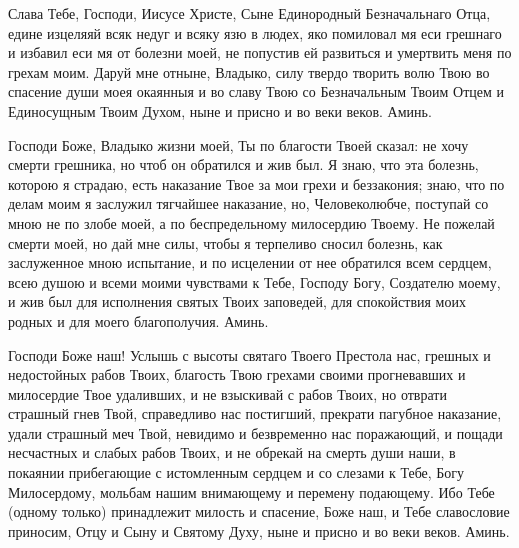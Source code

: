 \mychapterending


\begin{mymulticols}
 


Слава Тебе, Господи, Иисусе Христе, Сыне Единородный Безначальнаго Отца, едине изцеляяй всяк недуг и всяку язю в людех, яко помиловал мя еси грешнаго и избавил еси мя от болезни моей, не попустив ей развиться и умертвить меня по грехам моим. Даруй мне отныне, Владыко, силу твердо творить волю Твою во спасение души моея окаянныя и во славу Твою со Безначальным Твоим Отцем и Единосущным Твоим Духом, ныне и присно и во веки веков. Аминь.




\end{mymulticols}

\mychapterending


\begin{mymulticols}
 


Господи Боже, Владыко жизни моей, Ты по благости Твоей сказал: не хочу смерти грешника, но чтоб он обратился и жив был. Я знаю, что эта болезнь, которою я страдаю, есть наказание Твое за мои грехи и беззакония; знаю, что по делам моим я заслужил тягчайшее наказание, но, Человеколюбче, поступай со мною не по злобе моей, а по беспредельному милосердию Твоему. Не пожелай смерти моей, но дай мне силы, чтобы я терпеливо сносил болезнь, как заслуженное мною испытание, и по исцелении от нее обратился всем сердцем, всею душою и всеми моими чувствами к Тебе, Господу Богу, Создателю моему, и жив был для исполнения святых Твоих заповедей, для спокойствия моих родных и для моего благополучия. Аминь. 




\end{mymulticols}

\mychapterending


\begin{mymulticols}
 




Господи Боже наш! Услышь с высоты святаго Твоего Престола нас, грешных и недостойных рабов Твоих, благость Твою грехами своими прогневавших и милосердие Твое удаливших, и не взыскивай с рабов Твоих, но отврати страшный гнев Твой, справедливо нас постигший, прекрати пагубное наказание, удали страшный меч Твой, невидимо и безвременно нас поражающий, и пощади несчастных и слабых рабов Твоих, и не обрекай на смерть души наши, в покаянии прибегающие с истомленным сердцем и со слезами к Тебе, Богу Милосердому, мольбам нашим внимающему и перемену подающему. Ибо Тебе (одному только) принадлежит милость и спасение, Боже наш, и Тебе славословие приносим, Отцу и Сыну и Святому Духу, ныне и присно и во веки веков. Аминь.




\end{mymulticols}

